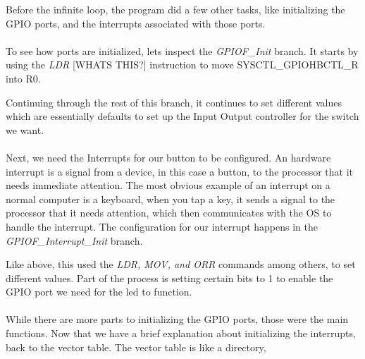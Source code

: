 \documentclass[12pt,a4paper]{report}
\begin{document}
Before the infinite loop, the program did a few other tasks, like initializing the GPIO ports, and the interrupts associated with those ports.  

\paragraph{}
To see how ports are initialized, lets inspect the \textit{GPIOF\_Init} branch. It starts by using the \textit{LDR} [WHATS THIS?] instruction to move SYSCTL\_GPIOHBCTL\_R into R0. 

Continuing through the rest of this branch, it continues to set different values which are essentially defaults to set up the Input Output controller for the switch we want.

\paragraph{}
Next, we need the Interrupts for our button to be configured. An hardware interrupt is a signal from a device, in this case a button, to the processor that it needs immediate attention. The most obvious example of an interrupt on a normal computer is a keyboard, when you tap a key, it sends a signal to the processor that it needs attention, which then communicates with the OS to handle the interrupt. 
The configuration for our interrupt happens in the \textit{GPIOF\_Interrupt\_Init} branch. 

Like above, this used the \textit{LDR, MOV, and ORR} commands among others, to set different values. Part of the process is setting certain bits to 1 to enable the GPIO port we need for the led to function. 

\paragraph{}
While there are more parts to initializing the GPIO ports, those were the main functions. Now that we have a brief explanation about initializing the interrupts, back to the vector table. The vector table is like a directory, 

\medskip
\end{document}

